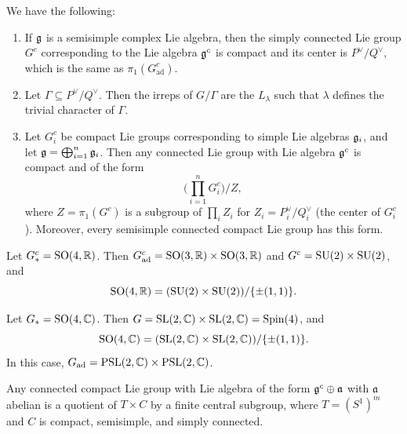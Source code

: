 \begin{corollary}
  We have the following:
  \begin{enumerate}
    \item If $\mathfrak{g}$ is a semisimple
      complex Lie algebra, then the simply
      connected Lie group $G^c$
      corresponding to the Lie algebra $\mathfrak{g}^c$
      is compact and its center
      is $P^\vee / Q^\vee$, which is
      the same as $\pi_1(G^c_{\mathrm{ad}})$.
    \item Let $\Gamma \subseteq P^\vee / Q^\vee$.
      Then the irreps of $G / \Gamma$
      are the $L_\lambda$ such that
      $\lambda$ defines the trivial
      character of $\Gamma$.
    \item Let $G_i^c$ be compact Lie groups
      corresponding to simple
      Lie algebras $\mathfrak{g}_i$, and let
      $\mathfrak{g} = \bigoplus_{i = 1}^n \mathfrak{g}_i$. Then
      any connected Lie group with Lie
      algebra $\mathfrak{g}^c$ is compact and
      of the form
      \[
        \bigg(\prod_{i = 1}^n G_i^c\bigg) / Z,
      \]
      where $Z = \pi_1(G^c)$
      is a subgroup of $\prod_i Z_i$ for
      $Z_i = P_i^\vee / Q_i^\vee$ (the
      center of $G_i^c$). Moreover,
      every semisimple connected compact
      Lie group has this form.
  \end{enumerate}
\end{corollary}

\begin{example}
  Let $G_*^c = \operatorname{SO}(4, \mathbb{R})$. Then
  $G_{\mathrm{ad}}^c = \operatorname{SO}(3, \mathbb{R}) \times \operatorname{SO}(3, \mathbb{R})$ and
  $G^c = \operatorname{SU}(2) \times \operatorname{SU}(2)$, and
  \[
    \operatorname{SO}(4, \mathbb{R})
    = (\operatorname{SU}(2) \times \operatorname{SU}(2)) / \{\pm (1, 1)\}.
  \]
\end{example}

\begin{example}
  Let $G_* = \operatorname{SO}(4, \mathbb{C})$. Then
  $G = \operatorname{SL}(2, \mathbb{C}) \times \operatorname{SL}(2, \mathbb{C}) = \mathrm{Spin}(4)$,
  and
  \[
    \operatorname{SO}(4, \mathbb{C})
    = (\operatorname{SL}(2, \mathbb{C}) \times \operatorname{SL}(2, \mathbb{C})) / \{\pm (1, 1)\}.
  \]
  In this case, $G_{\mathrm{ad}} = \operatorname{PSL}(2, \mathbb{C}) \times \operatorname{PSL}(2, \mathbb{C})$.
\end{example}

\begin{corollary}
  Any connected compact Lie group with
  Lie algebra of the form
  $\mathfrak{g}^c \oplus \mathfrak{a}$
  with $\mathfrak{a}$ abelian
  is a quotient of
  $T \times C$ by a finite central subgroup,
  where $T = (S^1)^m$ and $C$ is
  compact, semisimple, and simply connected.
\end{corollary}

